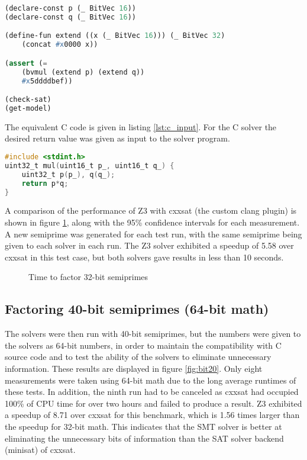 \documentclass{sig-alternate}
\begin{document}
\begin{lstlisting}[language=Lisp,caption={SMT-Lib Input},label={lst:smtlib}]
(declare-const p (_ BitVec 16))
(declare-const q (_ BitVec 16))

(define-fun extend ((x (_ BitVec 16))) (_ BitVec 32)
    (concat #x0000 x))

(assert (=
    (bvmul (extend p) (extend q))
    #x5ddddbef))

(check-sat)
(get-model)
\end{lstlisting}

The equivalent C code is given in listing \ref{lst:c_input}.  For the C solver the
desired return value was given as input to the solver program.

\begin{lstlisting}[language=C,caption={C Language input},label={lst:c_input}]
#include <stdint.h>
uint32_t mul(uint16_t p_, uint16_t q_) {
    uint32_t p(p_), q(q_);
    return p*q;
}
\end{lstlisting}

A comparison of the performance of Z3 with cxxsat (the custom clang plugin) is
shown in figure \ref{fig:bit16}, along with the 95\% confidence intervals for
each measurement.  A new semiprime was generated for each test run, with the same
semiprime being given to each solver in each run.  The Z3 solver exhibited a
speedup of 5.58 over cxxsat in this test case, but both solvers gave results
in less than 10 seconds.

\begin{figure}
    
    \caption{Time to factor 32-bit semiprimes}
    \label{fig:bit16}
\end{figure}

\subsection{Factoring 40-bit semiprimes (64-bit math)}
The solvers were then run with 40-bit semiprimes, but the numbers were given
to the solvers as 64-bit numbers, in order to maintain the compatibility with
C source code and to test the ability of the solvers to eliminate unnecessary
information.  These results are displayed in figure \ref{fig:bit20}.  Only
eight measurements were taken using 64-bit math due to the long average
runtimes of these tests.  In addition, the ninth run had to be canceled as
cxxsat had occupied 100\% of CPU time for over two hours and failed to produce
a result.  Z3 exhibited a speedup of 8.71 over cxxsat for this benchmark, which
is 1.56 times larger than the speedup for 32-bit math.  This indicates that
the SMT solver is better at eliminating the unnecessary bits of information
than the SAT solver backend (minisat) of cxxsat.
\end{document}
